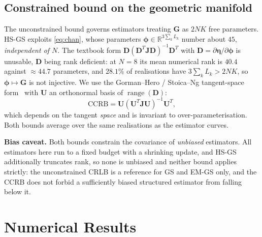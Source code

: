 \documentclass[journal]{IEEEtran}
\DeclareMathOperator{\range}{range}
\newcommand{\bG}{\mathbf{G}}
\newcommand{\bJ}{\mathbf{J}}
\newcommand{\bD}{\mathbf{D}}
\newcommand{\bU}{\mathbf{U}}
\begin{document}
\subsection{Constrained bound on the geometric manifold}

The unconstrained bound governs estimators treating $\bG$ as $2NK$ free
parameters. HS-GS exploits \eqref{eq:chan}, whose parameters
$\boldsymbol\phi\in\mathbb{R}^{3\sum_k L_k}$ number about $45$,
\emph{independent of $N$}. The textbook form $\bD(\bD^T\bJ\bD)^{-1}\bD^T$ with
$\bD=\partial\boldsymbol\eta/\partial\boldsymbol\phi$ is unusable, $\bD$ being
rank deficient: at $N=8$ its mean numerical rank is $40.4$ against $\approx
44.7$ parameters, and $28.1\%$ of realisations have $3\sum_k L_k>2NK$, so
$\boldsymbol\phi\mapsto\bG$ is not injective. We use the Gorman--Hero /
Stoica--Ng tangent-space form~\cite{gorman1990,stoica1998} with $\bU$ an
orthonormal basis of
$\range(\bD)$:
\begin{equation}
\mathrm{CCRB}=\bU(\bU^T\bJ\bU)^{-1}\bU^T,
\label{eq:ccrb}
\end{equation}
which depends on the tangent \emph{space} and is invariant to
over-parameterisation. Both bounds average over the same realisations as the
estimator curves.

\textbf{Bias caveat.} Both bounds constrain the covariance of \emph{unbiased}
estimators. All estimators here run to a fixed budget with a shrinking update,
and HS-GS additionally truncates rank, so none is unbiased and neither bound
applies strictly: the unconstrained CRLB is a reference for GS and EM-GS only,
and the CCRB does not forbid a sufficiently biased structured estimator from
falling below it.

\section{Numerical Results}
\label{sec:results}
\end{document}
